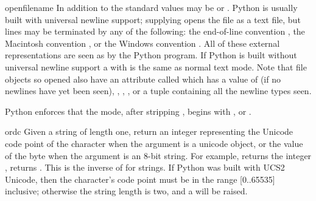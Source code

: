 \begin{funcdesc}{open}{filename}
  In addition to the standard  values 
  may be  or .  Python is usually built with universal
  newline support; supplying  opens the file as a text file, but
  lines may be terminated by any of the following: the \UNIX{} end-of-line
  convention , 
  the Macintosh convention , or the Windows
  convention . All of these external representations are seen as
  by the Python program. If Python is built without universal newline support
  a  with  is the same as normal text mode.  Note that
  file objects so opened also have an attribute called
   which has a value of  (if no newlines
  have yet been seen), , , ,
  or a tuple containing all the newline types seen.

  Python enforces that the mode, after stripping , begins with
  ,  or .

\end{funcdesc}

\begin{funcdesc}{ord}{c}
  Given a string of length one, return an integer representing the
  Unicode code point of the character when the argument is a unicode object,
  or the value of the byte when the argument is an 8-bit string.
  For example,  returns the integer ,
   returns .  This is the inverse of
   for strings.
  If Python was built with
  UCS2 Unicode, then the character's code point must be in the range
  [0..65535] inclusive; otherwise the string length is two, and a
   will be raised.
\end{funcdesc}

